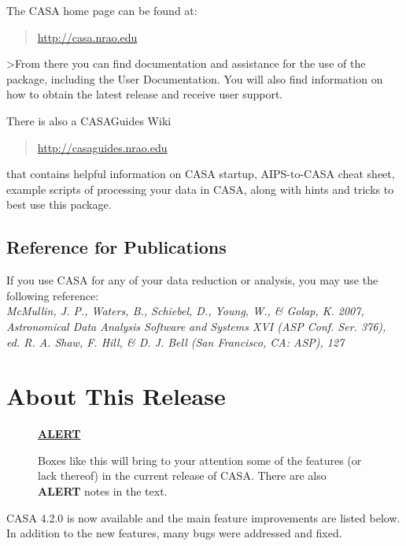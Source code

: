 The CASA home page can be found at:
\begin{quote}
  \url{http://casa.nrao.edu}
\end{quote}
>From there you can find documentation and assistance for the use
of the package, including the User Documentation.  You will
also find information on how to obtain the latest release and
receive user support.

There is also a CASAGuides Wiki
\begin{quote}
   \url{http://casaguides.nrao.edu}
\end{quote}
that contains helpful information on CASA startup, AIPS-to-CASA
cheat sheet, example scripts of processing your data in CASA,
along with hints and tricks to best use this package.

\subsection{Reference for Publications}

If you use CASA for any of your data reduction or analysis, you may
use the following reference:\\

{\it McMullin, J. P., Waters, B., Schiebel, D., Young, W., \& Golap, K. 2007, Astronomical Data Analysis Software and Systems XVI (ASP Conf. Ser. 376), ed. R. A. Shaw, F. Hill, \& D. J. Bell (San Francisco, CA: ASP), 127}




\section{About This Release}
\label{section:intro.release}

\begin{wrapfigure}{r}{2.5in}
  \begin{boxedminipage}{2.5in}
     \centerline{\underline{\bf ALERT}}
     Boxes like this will bring to your attention some of the
     features (or lack thereof) in the current release
     of CASA.  There are also {\bf ALERT} notes in the text.
  \end{boxedminipage}
\end{wrapfigure}

CASA 4.2.0 is now available and the main feature improvements are
listed below. In addition to the new features, many bugs were
addressed and fixed.

